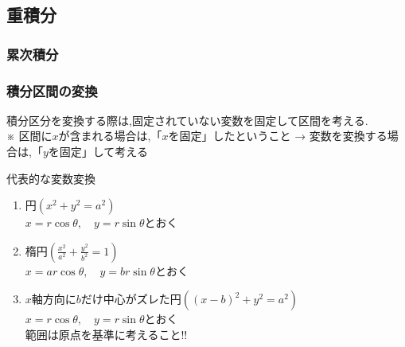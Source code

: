 \documentclass[a4paper]{jsarticle}
\begin{document}
\subsection{重積分}
\subsubsection{累次積分}
\subsubsection{積分区間の変換}
積分区分を変換する際は,固定されていない変数を固定して区間を考える.\\
※ 区間に$x$が含まれる場合は,「$x$を固定」したということ → 変数を変換する場合は,「$y$を固定」して考える
\begin{itembox}[l]{代表的な変数変換}
    \begin{enumerate}[(1)]
        \item 円\quad $\left(x^2+y^2=a^2\right)$\\
              $x=r\cos\theta,\quad y=r\sin\theta$とおく
        \item 楕円\quad $\left(\frac{x^2}{a^2}+\frac{y^2}{b^2}=1\right)$\\
              $x=ar\cos\theta,\quad y=br\sin\theta$とおく
        \item $x$軸方向に$b$だけ中心がズレた円\quad $\left(\left(x-b\right)^2+y^2=a^2\right)$\\
              $x=r\cos\theta,\quad y=r\sin\theta$とおく\\
              範囲は原点を基準に考えること!!
    \end{enumerate}
\end{itembox}
\end{document}
